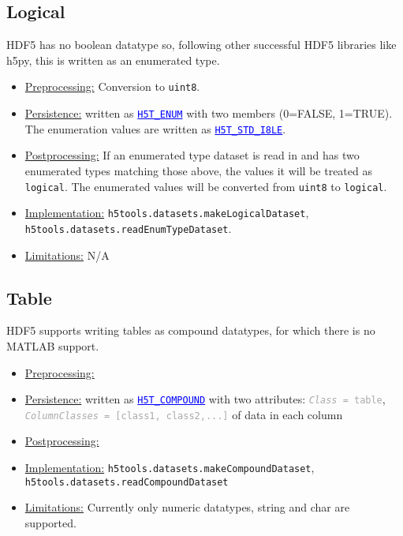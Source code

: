 \documentclass[11pt]{exam}
\newcommand\myurl[1]{\textcolor{blue}{\underline{#1}}}
\newcommand\myfcn[1]{\colorbox{codegray}{\textcolor{codeblue}{\texttt{#1}}}}
\newcommand\hdftype[1]{\texttt{\myurl{#1}}}
\newcommand\myatt[2]{\textcolor{darkgray}{\texttt{\textit{#1} = #2}}}
\begin{document}
		\subsection{Logical}
		\noindent HDF5 has no boolean datatype so, following other successful HDF5 libraries like h5py, this is written as an enumerated type.
		\begin{itemize}
			\item \underline{Preprocessing:} Conversion to \texttt{uint8}.
			\item \underline{Persistence:} written as \myurl{\texttt{H5T\_ENUM}} with two members (0=FALSE, 1=TRUE). The enumeration values are written as \hdftype{H5T\_STD\_I8LE}.
			\item \underline{Postprocessing:} If an enumerated type dataset is read in and has two enumerated types matching those above, the values it will be treated as \texttt{logical}. The enumerated values will be converted from \texttt{uint8} to \texttt{logical}. 
			\item \underline{Implementation:} \myfcn{h5tools.datasets.makeLogicalDataset}, \myfcn{h5tools.datasets.readEnumTypeDataset}.
			\item \underline{Limitations:} N/A
		\end{itemize}
		
		\subsection{Table}
		\noindent HDF5 supports writing tables as compound datatypes, for which there is no MATLAB support.
		\begin{itemize}
			\item \underline{Preprocessing:} 
			\item \underline{Persistence:} written as \myurl{\texttt{H5T\_COMPOUND}} with two attributes: \myatt{Class}{table}, \myatt{ColumnClasses}{[class1, class2,...]} of data in each column
			\item \underline{Postprocessing:} 
			\item \underline{Implementation:} \myfcn{h5tools.datasets.makeCompoundDataset}, \\\myfcn{h5tools.datasets.readCompoundDataset}
			\item \underline{Limitations:} Currently only numeric datatypes, string and char are supported.
		\end{itemize}
		
\end{document}
